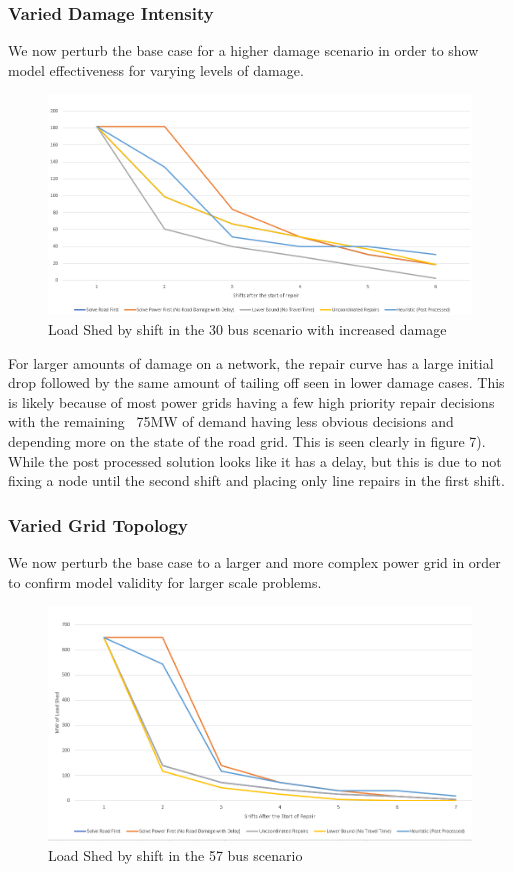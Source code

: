 \documentclass{article}
\begin{document}
	\subsubsection{Varied Damage Intensity}
	We now perturb the base case for a higher damage scenario in order to show model effectiveness for varying levels of damage.
	\begin{figure}[H]
		\centering
		\includegraphics[width=.9\linewidth]{Rplot30scenario2.png}
		\caption{Load Shed by shift in the 30 bus scenario with increased damage}
		\label{fig:sub2}
		
		
	\end{figure}

	For larger amounts of damage on a network, the repair curve has a large initial drop followed by the same amount of tailing off seen in lower damage cases. This is likely because of most power grids having a few high priority repair decisions with the remaining ~75MW of demand having less obvious decisions and depending more on the state of the road grid. This is seen clearly in figure 7). While the post processed solution looks like it has a delay, but this is due to not fixing a node until the second shift and placing only line repairs in the first shift.
	\subsubsection{Varied Grid Topology}
	We now perturb the base case to a larger and more complex power grid in order to confirm model validity for larger scale problems.
	\begin{figure}[H]
		\centering
		\includegraphics[width=.9\linewidth]{Rplot57.png}
		\caption{Load Shed by shift in the 57 bus scenario}
		\label{fig:sub2}
		
		
	\end{figure}
	
\end{document}
